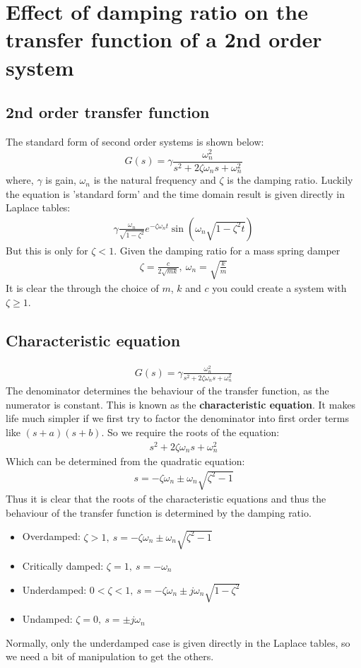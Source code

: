\documentclass[class=report, crop=false, 12pt,a4paper]{standalone}
\begin{document}
\section{Effect of damping ratio on the transfer function of a 2nd order system}
\subsection{2nd order transfer function}
The standard form of second order systems is shown below:
\begin{equation}
  G(s) = \gamma \frac{\omega_n^2}{s^2 + 2\zeta \omega_n s + \omega_n^2}
\end{equation}
where, $\gamma$ is gain, $\omega_n$ is the natural frequency and $\zeta$ is the damping ratio. Luckily the equation is 'standard form' and the time domain result is given directly in Laplace tables:
\begin{align}
  \gamma \frac{\omega_n}{\sqrt{1-\zeta^2}}e^{-\zeta \omega_n t} \sin{\left(\omega_n\sqrt{1-\zeta^2 t}\right)}
\end{align}
But this is only for $\zeta < 1$. Given the damping ratio for a mass spring damper
\begin{align}
  \zeta = \frac{c}{2\sqrt{mk}}, \ \omega_n = \sqrt{\frac{k}{m}}
\end{align}
It is clear the through the choice of $m$, $k$ and $c$ you could create a system with $\zeta \geq 1$.
\subsection{Characteristic equation}
\begin{align}
  G(s) = \gamma \frac{\omega_n^2}{s^2 + 2\zeta \omega_n s + \omega_n^2}
\end{align}
The denominator determines the behaviour of the transfer function, as the numerator is constant. This is known as the \textbf{characteristic equation}. It makes life much simpler if we first try to factor the denominator into first order terms like $(s+a)(s+b)$. So we require the roots of the equation:
\begin{align}
  s^2 + 2\zeta \omega_n s + \omega_n^2
\end{align}
Which can be determined from the quadratic equation:
\begin{align}
  s = -\zeta \omega_n \pm \omega_n \sqrt{\zeta^2 - 1}
\end{align}
Thus it is clear that the roots of the characteristic equations and thus the behaviour of the transfer function is determined by the damping ratio.
\begin{itemize}
  \item Overdamped: $\zeta > 1, \ s = -\zeta \omega_n \pm \omega_n \sqrt{\zeta^2 - 1}$
  \item Critically damped: $\zeta = 1, \ s = -\omega_n$
  \item Underdamped: $0 < \zeta < 1, \ s = -\zeta \omega_n \pm j \omega_n \sqrt{1-\zeta^2}$
  \item Undamped: $\zeta = 0, \ s = \pm j\omega_n$
\end{itemize}
Normally, only the underdamped case is given directly in the Laplace tables, so we need a bit of manipulation to get the others. 
\end{document}
